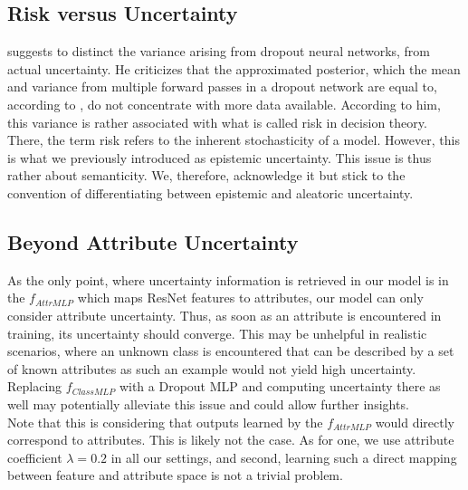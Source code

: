 \documentclass[a4paper,cleardoubleempty,BCOR1cm, 11pt]{report}
\begin{document}
\subsection{Risk versus Uncertainty}
\citet{osband2016risk} suggests to distinct the variance arising from dropout neural networks, from actual uncertainty. He criticizes that the approximated posterior, which the mean and variance from multiple forward passes in a dropout network are equal to, according to \citet{gal2016dropout}, do not concentrate with more data available. According to him, this variance is rather associated with what is called risk in decision theory. There, the term risk refers to the inherent stochasticity of a model. However, this is what we previously introduced as epistemic uncertainty. This issue is thus rather about semanticity. We, therefore, acknowledge it but stick to the convention of differentiating between epistemic and aleatoric uncertainty.


\subsection{Beyond Attribute Uncertainty}\label{sec:attr_uncertainty}
As the only point, where uncertainty information is retrieved in our model is in the $f_{AttrMLP}$ which maps ResNet features to attributes, our model can only consider attribute uncertainty. Thus, as soon as an attribute is encountered in training, its uncertainty should converge. This may be unhelpful in realistic scenarios, where an unknown class is encountered that can be described by a set of known attributes as such an example would not yield high uncertainty. Replacing $f_{ClassMLP}$ with a Dropout MLP and computing uncertainty there as well may potentially alleviate this issue and could allow further insights.\\
Note that this is considering that outputs learned by the $f_{AttrMLP}$ would directly correspond to attributes. This is likely not the case. As for one, we use attribute coefficient $\lambda=0.2$ in all our settings, and second, learning such a direct mapping between feature and attribute space is not a trivial problem. %
\end{document}
